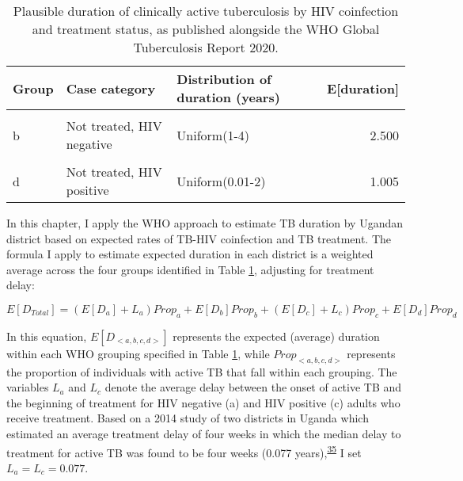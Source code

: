 \documentclass[
]{article}
\begin{document}
\begin{table}[!h]

\caption{\label{tab:who-duration-groupings}Plausible duration of clinically active tuberculosis by HIV coinfection and treatment status, as published alongside the WHO Global Tuberculosis Report 2020.}
\centering
\begin{tabular}[t]{lllr}
\toprule
Group & Case category & Distribution of duration (years) & E[duration]\\
\midrule
\cellcolor{gray!6}{a} & \cellcolor{gray!6}{Treated, HIV negative} & \cellcolor{gray!6}{Uniform(0.2-2)} & \cellcolor{gray!6}{1.100}\\
b & Not treated, HIV negative & Uniform(1-4) & 2.500\\
\cellcolor{gray!6}{c} & \cellcolor{gray!6}{Treated, HIV positive} & \cellcolor{gray!6}{Uniform(0.01-1)} & \cellcolor{gray!6}{0.505}\\
d & Not treated, HIV positive & Uniform(0.01-2) & 1.005\\
\bottomrule
\end{tabular}
\end{table}

In this chapter, I apply the WHO approach to estimate TB duration by Ugandan district based on expected rates of TB-HIV coinfection and TB treatment. The formula I apply to estimate expected duration in each district is a weighted average across the four groups identified in Table \ref{tab:who-duration-groupings}, adjusting for treatment delay:

\[E[D_{Total}] = (E[D_a] + L_a) Prop_a + E[D_b]Prop_b + (E[D_c] + L_c)Prop_c + E[D_d]Prop_d\]

In this equation, \(E[D_{<a,b,c,d>}]\) represents the expected (average) duration within each WHO grouping specified in Table \ref{tab:who-duration-groupings}, while \(Prop_{<a,b,c,d>}\) represents the proportion of individuals with active TB that fall within each grouping. The variables \(L_a\) and \(L_c\) denote the average delay between the onset of active TB and the beginning of treatment for HIV negative (a) and HIV positive (c) adults who receive treatment. Based on a 2014 study of two districts in Uganda which estimated an average treatment delay of four weeks in which the median delay to treatment for active TB was found to be four weeks (0.077 years),\textsuperscript{\protect\hyperlink{ref-Buregyeya2014}{35}} I set \(L_a = L_c = 0.077\).
\end{document}
